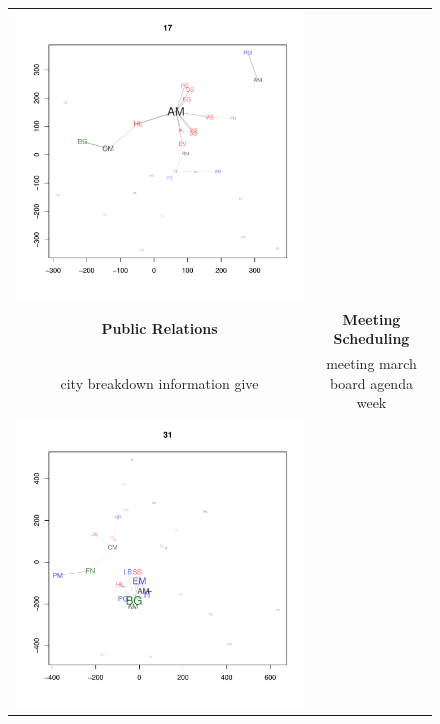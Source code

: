 \begin{figure}[t]
\begin{minipage}[b]{0.5\linewidth}
\begin{tabular}{cc}
\includegraphics[scale=.29, trim=.4in .6in .4in .8in, clip=true]{latent_space_17} \\
{\bf Public Relations} &
{\bf Meeting Scheduling} \\
{\small city breakdown information give} &
{\small meeting march board agenda week} \\
\includegraphics[scale=.29, trim=.4in .6in .4in .8in, clip=true]{latent_space_31} &

\end{tabular}
\end{minipage}
\end{figure}
